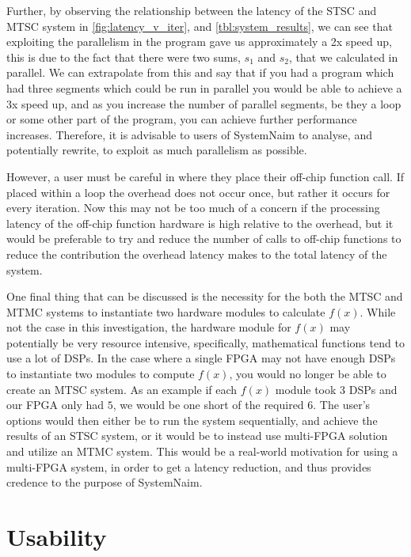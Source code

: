 Further, by observing the relationship between the latency of the STSC and MTSC system in \autoref{fig:latency_v_iter}, and \autoref{tbl:system_results}, we can see that exploiting the parallelism in the program gave us approximately a 2x speed up, this is due to the fact that there were two sums, $s_1$ and $s_2$, that we calculated in parallel. We can extrapolate from this and say that if you had a program which had three segments which could be run in parallel you would be able to achieve a 3x speed up, and as you increase the number of parallel segments, be they a loop or some other part of the program, you can achieve further performance increases. Therefore, it is advisable to users of SystemNaim to analyse, and potentially rewrite, to exploit as much parallelism as possible.

However, a user must be careful in where they place their off-chip function call. If placed within a loop the overhead does not occur once, but rather it occurs for every iteration. Now this may not be too much of a concern if the processing latency of the off-chip function hardware is high relative to the overhead, but it would be preferable to try and reduce the number of calls to off-chip functions to reduce the contribution the overhead latency makes to the total latency of the system.

One final thing that can be discussed is the necessity for the both the MTSC and MTMC systems to instantiate two hardware modules to calculate $f(x)$. While not the case in this investigation, the hardware module for $f(x)$ may potentially be very resource intensive, specifically, mathematical functions tend to use a lot of DSPs. In the case where a single FPGA may not have enough DSPs to instantiate two modules to compute $f(x)$, you would no longer be able to create an MTSC system. As an example if each $f(x)$ module took 3 DSPs and our FPGA only had $5$, we would be one short of the required $6$. The user's options would then either be to run the system sequentially, and achieve the results of an STSC system, or it would be to instead use multi-FPGA solution and utilize an MTMC system. This would be a real-world motivation for using a multi-FPGA system, in order to get a latency reduction, and thus provides credence to the purpose of SystemNaim.



\section{Usability}

